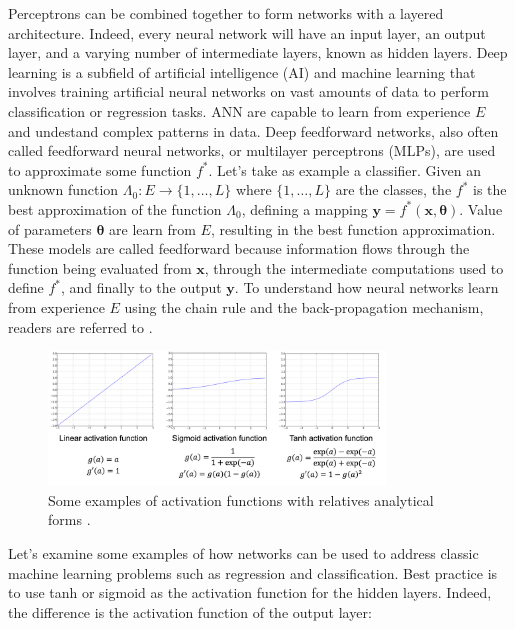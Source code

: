 Perceptrons can be combined together to form networks with a layered architecture. Indeed, every neural network will have an input layer, an output layer, and a varying number of intermediate layers, known as hidden layers. Deep learning is a subfield of artificial intelligence (AI) and machine learning that involves training artificial neural networks on vast amounts of data to perform classification or regression tasks. ANN are capable to learn from experience $E$ and undestand complex patterns in data. Deep feedforward networks, also often called feedforward neural networks, or multilayer perceptrons (MLPs), are used to approximate some function $f^*$. Let's take as example a classifier. Given an unknown function $\Lambda_0:E \rightarrow \{1,\dots,L\}$ where $\{1,\dots,L\}$ are the classes, the $f^*$ is the best approximation of the function $\Lambda_0$, defining a mapping $\mathbf{y}=f^*\left(\mathbf{x}, \bm{\theta} \right)$. Value of parameters $\bm{\theta}$ are learn from $E$, resulting in the best function approximation. These models are called feedforward because information flows through the function being evaluated from $\mathbf{x}$, through the intermediate computations used to define $f^*$, and finally to the output $\mathbf{y}$. To understand how neural networks learn from experience $E$ using the chain rule and the back-propagation mechanism, readers are referred to \citeauthor{goodfellow_deep_2016}.
\begin{figure}
    \centering
    \includegraphics[width=0.8\textwidth]{Images/activationfunction.png}
    \caption[Activation functions.]{Some examples of activation functions with relatives analytical forms \cite{matteo_matteucci_perceptrons_2021}.}
    \label{fig:actfunc}
\end{figure}
Let's examine some examples of how networks can be used to address classic machine learning problems such as regression and classification. Best practice is to use tanh or sigmoid as the activation function for the hidden layers. Indeed, the difference is the activation function of the output layer: 
